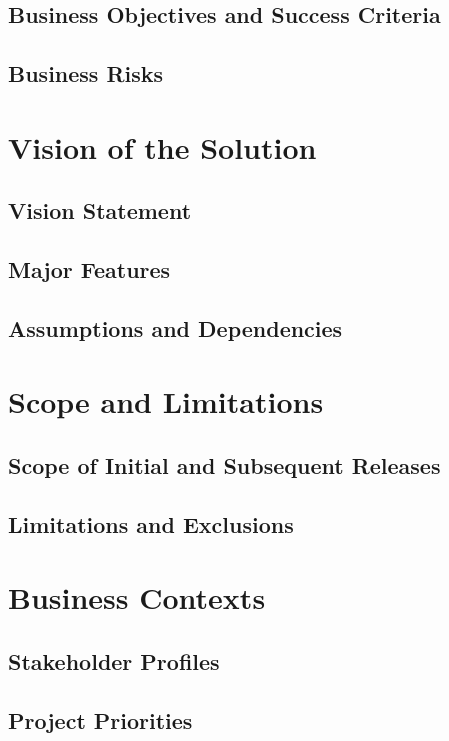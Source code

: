 \documentclass[11pt,letterpaper,rotate]{article}
\begin{document}
\subsection{Business Objectives and Success Criteria}


\subsection{Business Risks}


\section{Vision of the Solution}


\subsection{Vision Statement}


\subsection{Major Features}


\subsection{Assumptions and Dependencies}


\section{Scope and Limitations}


\subsection{Scope of Initial and Subsequent Releases}


\subsection{Limitations and Exclusions}


\section{Business Contexts}


\subsection{Stakeholder Profiles}


\subsection{Project Priorities}

\end{document}
